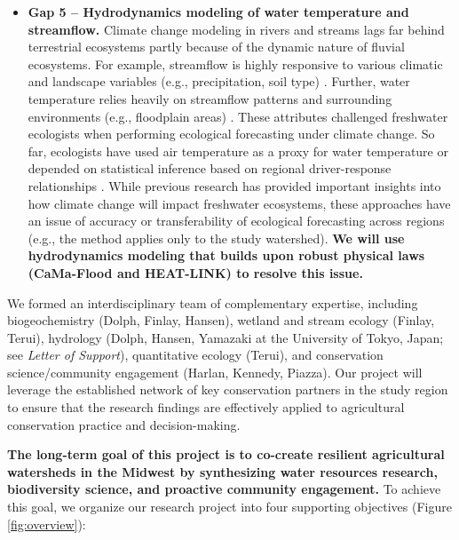\documentclass[12pt, class=article, crop=false]{standalone}
\begin{document}
\begin{itemize}
    \item \textbf{Gap 5 -- Hydrodynamics modeling of water temperature and streamflow.} Climate change modeling in rivers and streams lags far behind terrestrial ecosystems partly because of the dynamic nature of fluvial ecosystems.
    For example, streamflow is highly responsive to various climatic and landscape variables (e.g., precipitation, soil type) \citep{yamazaki_physically_2011, dodds_freshwater_2017}.
    Further, water temperature relies heavily on streamflow patterns and surrounding environments (e.g., floodplain areas) \citep{tokuda_development_2019}.
    These attributes challenged freshwater ecologists when performing ecological forecasting under climate change. So far, ecologists have used air temperature as a proxy for water temperature \citep[e.g.,][]{wenger_flow_2011, comte_climate_2016} or depended on statistical inference based on regional driver-response relationships \citep[e.g.,][]{troia_species_2019}.
    While previous research has provided important insights into how climate change will impact freshwater ecosystems, these approaches have an issue of accuracy or transferability of ecological forecasting across regions (e.g., the method applies only to the study watershed). \textbf{We will use hydrodynamics modeling that builds upon robust physical laws (CaMa-Flood and HEAT-LINK) to resolve this issue.}
\end{itemize}

We formed an interdisciplinary team of complementary expertise, including biogeochemistry (Dolph, Finlay, Hansen), wetland and stream ecology (Finlay, Terui), hydrology (Dolph, Hansen, Yamazaki at the University of Tokyo, Japan; see \textit{Letter of Support}), quantitative ecology (Terui), and conservation science/community engagement (Harlan, Kennedy, Piazza).
Our project will leverage the established network of key conservation partners in the study region to ensure that the research findings are effectively applied to agricultural conservation practice and decision-making.

\textbf{The long-term goal of this project is to co-create resilient agricultural watersheds in the Midwest by synthesizing water resources research, biodiversity science, and proactive community engagement.}
To achieve this goal, we organize our research project into four supporting objectives (Figure \ref{fig:overview}):
\end{document}
